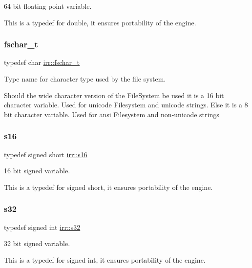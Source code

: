 64 bit floating point variable. 

This is a typedef for double, it ensures portability of the engine. \mbox{\label{namespaceirr_a813cca9bac9fa0c1427d89720a451460}} 
\subsubsection{\texorpdfstring{fschar\+\_\+t}{fschar\_t}}
{\footnotesize\ttfamily typedef char \hyperlink{namespaceirr_a813cca9bac9fa0c1427d89720a451460}{irr\+::fschar\+\_\+t}}



Type name for character type used by the file system. 

Should the wide character version of the File\+System be used it is a 16 bit character variable. Used for unicode Filesystem and unicode strings. Else it is a 8 bit character variable. Used for ansi Filesystem and non-\/unicode strings \mbox{\label{namespaceirr_a43ace0af066371ac0862bac3f7314220}} 
\subsubsection{\texorpdfstring{s16}{s16}}
{\footnotesize\ttfamily typedef signed short \hyperlink{namespaceirr_a43ace0af066371ac0862bac3f7314220}{irr\+::s16}}



16 bit signed variable. 

This is a typedef for signed short, it ensures portability of the engine. \mbox{\label{namespaceirr_ac66849b7a6ed16e30ebede579f9b47c6}} 
\subsubsection{\texorpdfstring{s32}{s32}}
{\footnotesize\ttfamily typedef signed int \hyperlink{namespaceirr_ac66849b7a6ed16e30ebede579f9b47c6}{irr\+::s32}}



32 bit signed variable. 

This is a typedef for signed int, it ensures portability of the engine. \mbox{\label{namespaceirr_abf54bd535f8d4dd996270e68c3ad8c08}} 

